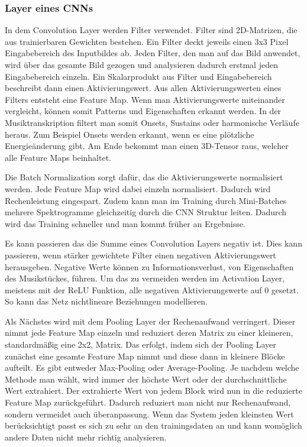 \subsubsection{Layer eines CNNs}
In dem Convolution Layer werden Filter verwendet.
Filter sind 2D-Matrizen, die aus trainierbaren Gewichten bestehen.
Ein Filter deckt jeweils einen 3x3 Pixel Eingabebereich des Inputbildes ab.
Jeden Filter, den man auf das Bild anwendet,
wird über das gesamte Bild gezogen und analysieren dadurch erstmal jeden Eingabebereich einzeln.
Ein Skalarprodukt aus Filter und Eingabebereich beschreibt dann einen Aktivierungswert.
Aus allen Aktivierungswerten eines Filters entsteht eine Feature Map.
Wenn man Aktivierungswerte miteinander vergleicht,
können somit Patterns und Eigenschaften erkannt werden.
In der Musiktranskription filtert man somit Onsets, Sustains oder harmonische Verläufe heraus.
Zum Beispiel Onsets werden erkannt, wenn es eine plötzliche Energieänderung gibt.
Am Ende bekommt man einen 3D-Tensor raus, welcher alle Feature Maps beinhaltet.

Die Batch Normalization sorgt dafür, das die Aktivierungswerte normalisiert werden.
Jede Feature Map wird dabei einzeln normalisiert.
Dadurch wird Rechenleistung eingespart.
Zudem kann man im Training durch Mini-Batches mehrere Spektrogramme gleichzeitig durch die CNN Struktur leiten.
Dadurch wird das Training schneller und man kommt früher an Ergebnisse.

Es kann passieren das die Summe eines Convolution Layers negativ ist.
Dies kann passieren, wenn stärker gewichtete Filter einen negativen Aktivierungswert herausgeben.
Negative Werte können zu Informationsverlust, von Eigenschaften des Musikstückes, führen.
Um das zu vermeiden werden im Activation Layer, meistens mit der ReLU Funktion,
alle negativen Aktivierungswerte auf 0 gesetzt.
So kann das Netz nichtlineare Beziehungen modellieren.

Als Nächstes wird mit dem Pooling Layer der Rechenaufwand verringert.
Dieser nimmt jede Feature Map einzeln und reduziert deren Matrix zu einer kleineren, standardmäßig eine 2x2, Matrix.
Das erfolgt, indem sich der Pooling Layer zunächst eine
gesamte Feature Map nimmt und diese dann in kleinere Blöcke aufteilt.
Es gibt entweder Max-Pooling oder Average-Pooling.
Je nachdem welche Methode man wählt, wird immer der höchste Wert oder der durchschnittliche Wert extrahiert.
Der extrahierte Wert von jedem Block wird nun in die reduzierte Feature Map zurückgeführt.
Dadurch reduziert man nicht nur Rechenaufwand, sondern vermeidet auch überanpassung.
Wenn das System jeden kleinsten Wert berücksichtigt passt es sich zu sehr an den trainingsdaten an
und kann womöglich andere Daten nicht mehr richtig analysieren.

